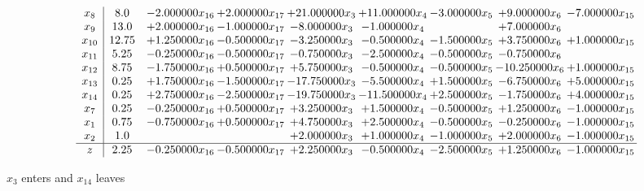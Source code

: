 \documentclass[10pt]{article}
\begin{document}
 \[\begin{array}{c| c c@{\hskip 2pt} c@{\hskip 2pt} c@{\hskip 2pt} c@{\hskip 2pt} c@{\hskip 2pt} c@{\hskip 2pt} c@{\hskip 2pt} }
 x_{8}   &  8.0 & -2.000000 x_{16} & + 2.000000 x_{17} & + 21.000000 x_{3} & + 11.000000 x_{4} & -3.000000 x_{5} & + 9.000000 x_{6} & -7.000000 x_{15}\\
 x_{9}   &  13.0 & + 2.000000 x_{16} & -1.000000 x_{17} & -8.000000 x_{3} & -1.000000 x_{4} &   & + 7.000000 x_{6} &   \\
 x_{10}   &  12.75 & + 1.250000 x_{16} & -0.500000 x_{17} & -3.250000 x_{3} & -0.500000 x_{4} & -1.500000 x_{5} & + 3.750000 x_{6} & + 1.000000 x_{15}\\
 x_{11}   &  5.25 & -0.250000 x_{16} & -0.500000 x_{17} & -0.750000 x_{3} & -2.500000 x_{4} & -0.500000 x_{5} & -0.750000 x_{6} &   \\
 x_{12}   &  8.75 & -1.750000 x_{16} & + 0.500000 x_{17} & + 5.750000 x_{3} & -0.500000 x_{4} & -0.500000 x_{5} & -10.250000 x_{6} & + 1.000000 x_{15}\\
 x_{13}   &  0.25 & + 1.750000 x_{16} & -1.500000 x_{17} & -17.750000 x_{3} & -5.500000 x_{4} & + 1.500000 x_{5} & -6.750000 x_{6} & + 5.000000 x_{15}\\
 x_{14}   &  0.25 & + 2.750000 x_{16} & -2.500000 x_{17} & -19.750000 x_{3} & -11.500000 x_{4} & + 2.500000 x_{5} & -1.750000 x_{6} & + 4.000000 x_{15}\\
 x_{7}   &  0.25 & -0.250000 x_{16} & + 0.500000 x_{17} & + 3.250000 x_{3} & + 1.500000 x_{4} & -0.500000 x_{5} & + 1.250000 x_{6} & -1.000000 x_{15}\\
 x_{1}   &  0.75 & -0.750000 x_{16} & + 0.500000 x_{17} & + 4.750000 x_{3} & + 2.500000 x_{4} & -0.500000 x_{5} & -0.250000 x_{6} & -1.000000 x_{15}\\
 x_{2}   &  1.0  &    &   & + 2.000000 x_{3} & + 1.000000 x_{4} & -1.000000 x_{5} & + 2.000000 x_{6} & -1.000000 x_{15}\\
\hline
z    &  2.25 & -0.250000 x_{16} & -0.500000 x_{17} & + 2.250000 x_{3} & -0.500000 x_{4} & -2.500000 x_{5} & + 1.250000 x_{6} & -1.000000 x_{15}\\
\end{array}\]


 $ x_{3} $ enters and $ x_{14} $ leaves 
\end{document}
